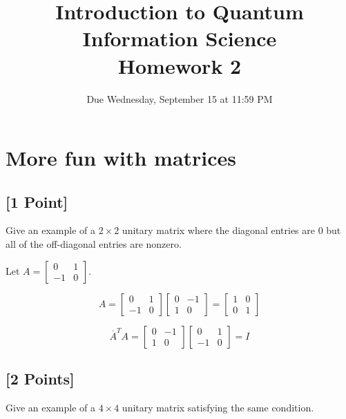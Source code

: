 \documentclass[11pt]{article}
\providecommand{\due}{Due Wednesday, September 15 at 11:59 PM}
\begin{document}
\title{Introduction to Quantum Information Science\\Homework 2}
\date{\due}

\maketitle

\section{More fun with matrices}

\subsection{[1 Point]} Give an example of a $2 \times 2$ unitary matrix where the diagonal entries are 0 but all of the off-diagonal entries are nonzero.

\begin{solution}
    Let $A =  \begin{bmatrix}
        0 & 1 \\
        -1 & 0
    \end{bmatrix} $. 

    \[
    A  = \begin{bmatrix}
        0 & 1 \\
        -1 & 0
    \end{bmatrix} \begin{bmatrix}
        0 & -1 \\ 1 & 0
    \end{bmatrix} = \begin{bmatrix}
        1 & 0 \\ 0 & 1
    \end{bmatrix}
    \] 

    \[
        \overline{A}^T A = \begin{bmatrix}
            0 & -1 \\ 1 & 0
        \end{bmatrix} \begin{bmatrix}
            0 & 1 \\
            -1 & 0
        \end{bmatrix} = I
    \]
\end{solution}

\subsection{[2 Points]} Give an example of a $4 \times 4$ unitary matrix satisfying the same condition.
\end{document}
